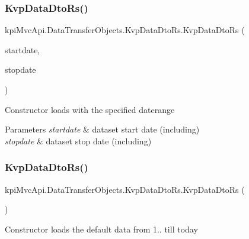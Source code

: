 \subsubsection{\texorpdfstring{Kvp\+Data\+Dto\+Rs()}{KvpDataDtoRs()}\hspace{0.1cm}{\footnotesize\ttfamily [3/6]}}
{\footnotesize\ttfamily kpi\+Mvc\+Api.\+Data\+Transfer\+Objects.\+Kvp\+Data\+Dto\+Rs.\+Kvp\+Data\+Dto\+Rs (\begin{DoxyParamCaption}\item[{Date\+Time}]{startdate,  }\item[{Date\+Time}]{stopdate }\end{DoxyParamCaption})\hspace{0.3cm}{\ttfamily [inline]}}



Constructor loads with the specified daterange 


\begin{DoxyParams}{Parameters}
{\em startdate} & dataset start date (including)\\
\hline
{\em stopdate} & dataset stop date (including)\\
\hline
\end{DoxyParams}
\mbox{\label{classkpi_mvc_api_1_1_data_transfer_objects_1_1_kvp_data_dto_rs_a8189fa1bf44fd56db7b2df7895373be4}} 
\subsubsection{\texorpdfstring{Kvp\+Data\+Dto\+Rs()}{KvpDataDtoRs()}\hspace{0.1cm}{\footnotesize\ttfamily [4/6]}}
{\footnotesize\ttfamily kpi\+Mvc\+Api.\+Data\+Transfer\+Objects.\+Kvp\+Data\+Dto\+Rs.\+Kvp\+Data\+Dto\+Rs (\begin{DoxyParamCaption}{ }\end{DoxyParamCaption})\hspace{0.3cm}{\ttfamily [inline]}}



Constructor loads the default data from 1.. till today 


